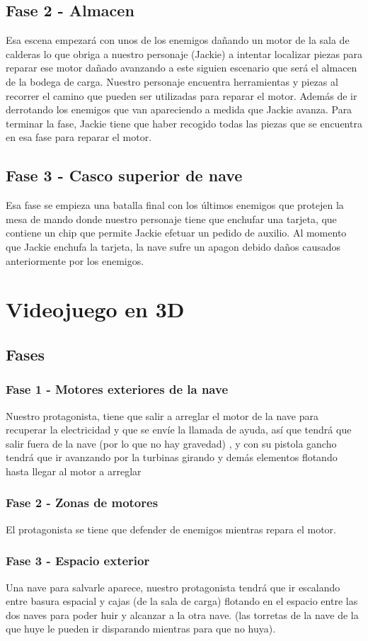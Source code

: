 \subsection{Fase 2 - Almacen}
Esa escena empezará con unos de los enemigos dañando un motor de la sala de calderas lo que obriga a nuestro personaje (Jackie) a intentar localizar piezas para reparar ese motor dañado avanzando a este siguien escenario que será el almacen de la bodega de carga.
Nuestro personaje encuentra herramientas y piezas al 
recorrer el camino que pueden ser utilizadas para reparar el motor.
Además de ir derrotando los enemigos que van apareciendo a medida que Jackie avanza.
Para terminar la fase, Jackie tiene que haber recogido todas las piezas que se encuentra en esa fase para reparar el motor.

\subsection{Fase 3 - Casco superior de nave}

Esa fase se empieza una batalla final con los últimos enemigos que protejen la mesa de mando donde nuestro personaje tiene que enchufar una tarjeta, que contiene un chip que permite Jackie efetuar un pedido de auxilio. Al momento que Jackie enchufa la tarjeta, la nave sufre un apagon debido daños causados anteriormente por los enemigos.

\section{Videojuego en 3D}

\subsection{Fases}
\subsubsection{Fase 1 - Motores exteriores de la nave}
Nuestro protagonista, tiene que salir a arreglar el motor de la nave para recuperar la electricidad y
 que se envíe la llamada de ayuda, así que tendrá que salir fuera de la nave (por lo que no hay gravedad) ,
  y con su pistola gancho tendrá que ir avanzando por la turbinas girando y demás elementos flotando
   hasta llegar al motor a arreglar 

\subsubsection{Fase 2 - Zonas de motores}
El protagonista se tiene que defender de enemigos mientras repara el motor.

\subsubsection{Fase 3 - Espacio exterior}
Una nave para salvarle aparece, nuestro protagonista tendrá que ir escalando entre basura espacial y cajas
(de la sala de carga) flotando en el espacio entre las dos naves para poder huir y alcanzar a la otra nave.
(las torretas de la nave de la que huye le pueden ir disparando mientras para que no huya).
